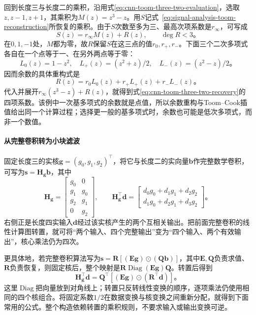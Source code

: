 回到长度三与长度二的乘积，沿用式\eqref{eq:cnn-toom-three-two-evaluation}，选取$z,z-1,z+1$，其乘积为$M(z)=z^3-z$。用$S$记式~\eqref{eq:signal-analysis-toom-reconstruction}所恢复的乘积。由于$S$次数至多为三、最高次项系数是$r_\infty$，可写成
\begin{equation}
  S(z)=r_\infty M(z)+R(z),\qquad \deg R<3\text{。}
  \label{eq:cnn-winograd-polynomial-remainder}
\end{equation}
在$0,1,-1$处，$M$都为零，故$R$保留$S$在这三点的值$r_0,r_+,r_-$。下面三个二次多项式各自在一个点等于一、在另外两点等于零：
\[
  L_0(z)=1-z^2,\quad
  L_+(z)=(z^2+z)/2,\quad
  L_-(z)=(z^2-z)/2\text{。}
\]
因而余数的具体重构式是
\begin{equation}
  R(z)=r_0L_0(z)+r_+L_+(z)+r_-L_-(z)\text{。}
  \label{eq:cnn-winograd-remainder-reconstruction}
\end{equation}
代入并展开$r_\infty(z^3-z)+R(z)$，就得到式\eqref{eq:cnn-toom-three-two-recovery}的四项系数。该例中一次基多项式的余数就是点值，所以余数重构与Toom--Cook插值给出同一个计算过程；选择更一般的基多项式时，余数也可能是低次多项式，而非一个数值。

\paragraph{从完整卷积转为小块滤波}

固定长度三的实核$\bm g=(g_0,g_1,g_2)^\top$，将它与长度二的实向量$\bm b$作完整数学卷积，可写为$\bm s=\bm H_{\bm g}\bm b$，其中
\begin{equation}
  \bm H_{\bm g}=\begin{bmatrix}
    g_0&0\\g_1&g_0\\g_2&g_1\\0&g_2
  \end{bmatrix},\qquad
  \bm H_{\bm g}^\top\bm d=
  \begin{bmatrix}
    d_0g_0+d_1g_1+d_2g_2\\
    d_1g_0+d_2g_1+d_3g_2
  \end{bmatrix}\text{。}
  \label{eq:cnn-winograd-filter-transposition}
\end{equation}
右侧正是长度四实输入$\bm d$经过该实核产生的两个互相关输出。把前面完整卷积的线性计算图转置，就可将“两个输入、四个完整输出”变为“四个输入、两个有效输出”，核心乘法仍为四次。

更具体地，若完整卷积算法写为$\bm s=\bm R[(\bm E\bm g)\odot(\bm Q\bm b)]$，其中$\bm E,\bm Q$负责求值、$\bm R$负责恢复，则固定核后，整个映射是$\bm R\operatorname{Diag}(\bm E\bm g)\bm Q$。转置后得到
\[
  \bm H_{\bm g}^\top\bm d
    =\bm Q^\top[(\bm E\bm g)\odot(\bm R^\top\bm d)]\text{。}
\]
这里$\operatorname{Diag}$把向量放到对角线上；转置只反转线性变换的顺序，逐项乘法仍使用相同的四个核组合。将固定系数$1/2$在数据变换与核变换之间重新分配，就得到下面常用的公式。整个构造依赖转置的乘积规则，不要求输入或输出变换可逆。

